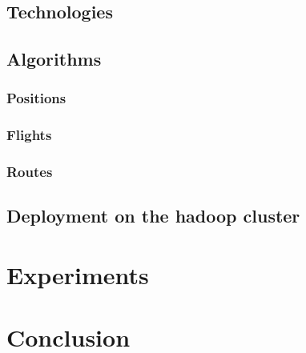 \documentclass{vldb}
\begin{document}
\subsection{Technologies}

\subsection{Algorithms}

\subsubsection{Positions}

\subsubsection{Flights}

\subsubsection{Routes}

\subsection{Deployment on the hadoop cluster}

\section{Experiments}

\section{Conclusion}
\end{document}
